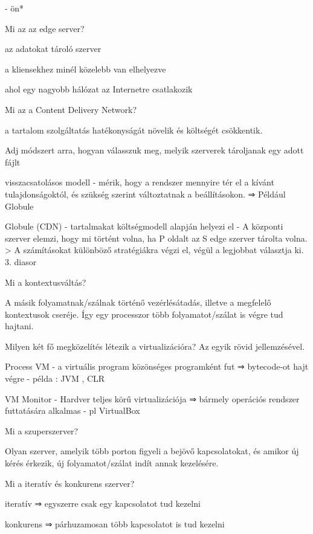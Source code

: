 \documentclass[twoside, a4paper, 12pt]{article}
\begin{document}
\begin{description}
        - ön*
    \item Mi az az edge server?
    \item az adatokat tároló szerver
    \item a kliensekhez minél közelebb van elhelyezve
    \item ahol egy nagyobb hálózat az Internetre csatlakozik
    \item Mi az a  Content Delivery Network?
    \item a tartalom szolgáltatás hatékonyságát növelik és költségét csökkentik.
    \item Adj módszert arra, hogyan válasszuk meg, melyik szerverek tároljanak egy adott fájlt
    \item visszacsatolásos modell
        - mérik, hogy a rendszer mennyire tér el a kívánt tulajdonságoktól, és szükség szerint változtatnak a
        beállításokon. ⇒ Például Globule
    \item Globule (CDN)
        - tartalmakat költségmodell alapján helyezi el
        - A központi szerver elemzi, hogy mi történt volna, ha P oldalt az S edge szerver tárolta volna.
        > A számításokat különböző stratégiákra végzi el, végül a legjobbat választja ki.
        3. diasor
    \item  Mi a kontextusváltás?
    \item A másik folyamatnak/szálnak történő  vezérlésátadás, illetve a megfelelő kontextusok cseréje. Így egy
        processzor több folyamatot/szálat is végre tud hajtani.
    \item  Milyen két fő megközelítés létezik a virtualizációra? Az egyik rövid jellemzésével.
    \item Process VM
        - a virtuális program közönséges programként fut ⇒ bytecode-ot hajt végre
        - példa : JVM , CLR
    \item VM Monitor
        - Hardver teljes körű virtualizációja ⇒ bármely operációs rendszer futtatására alkalmas
        - pl VirtualBox
    \item  Mi a szuperszerver?
    \item Olyan szerver, amelyik több porton figyeli a bejövő kapcsolatokat, és amikor új kérés érkezik, új folyamatot/szálat indít
        annak kezelésére. 
    \item  Mi a iteratív és konkurens szerver?
    \item iteratív  ⇒ egyszerre csak egy kapcsolatot tud kezelni
    \item konkurens ⇒ párhuzamosan több kapcsolatot is tud kezelni

\end{description}
\end{document}
